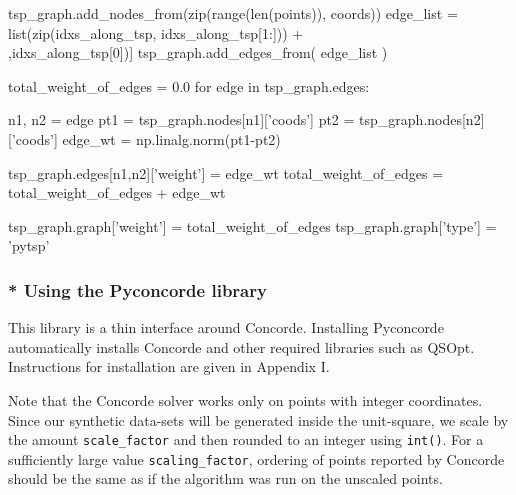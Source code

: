 tsp_graph.add_nodes_from(zip(range(len(points)), coords))
edge_list = list(zip(idxs_along_tsp, idxs_along_tsp[1:])) + \\
                  [(idxs_along_tsp[-1],idxs_along_tsp[0])]
tsp_graph.add_edges_from(  edge_list  )
\nwendcode{}\nwdocspar


\nwenddocs{}\endmoddef\nwstartdeflinemarkup{}\nwenddeflinemarkup
total_weight_of_edges = 0.0
for edge in tsp_graph.edges:

      n1, n2 = edge
      pt1 = tsp_graph.nodes[n1]['coods'] 
      pt2 = tsp_graph.nodes[n2]['coods']
      edge_wt = np.linalg.norm(pt1-pt2)

      tsp_graph.edges[n1,n2]['weight'] = edge_wt
      total_weight_of_edges = total_weight_of_edges + edge_wt 
\nwendcode{}\nwdocspar

\nwenddocs{}\endmoddef\nwstartdeflinemarkup{}\nwenddeflinemarkup
tsp_graph.graph['weight'] = total_weight_of_edges
tsp_graph.graph['type']   = 'pytsp'
\nwendcode{}\nwdocspar


\subsubsection{* Using the Pyconcorde library}

This library is a thin interface around Concorde. Installing Pyconcorde
automatically installs Concorde and other required libraries such as QSOpt. Instructions for installation
are given in Appendix I.  

Note that the Concorde solver works only on points with integer coordinates. Since our synthetic data-sets
will be generated inside the unit-square, we scale by the amount \verb|scale_factor| and then 
rounded to an integer using \verb|int()|. For a sufficiently large value \verb|scaling_factor|,  
ordering of points reported by Concorde should be the same as  if the algorithm was run on the 
unscaled points. 


